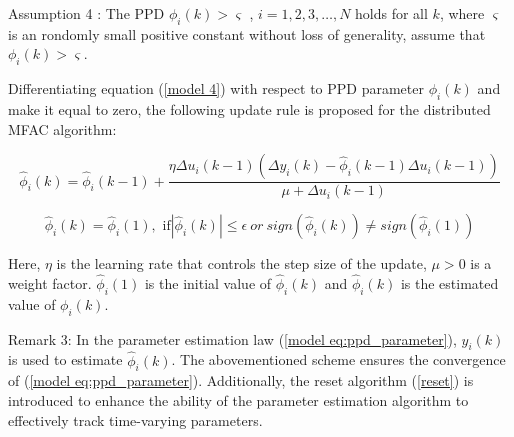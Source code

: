 \documentclass[journal,onecolumn]{IEEEtran}
\begin{document}
Assumption 4 : The PPD \(\phi_i(k) > \varsigma\) , \(i = 1,2,3, \dots, N\) holds for all \(k\), where \( \varsigma \) is an rondomly small positive constant without loss of generality, assume that \(\phi_i(k) > \varsigma\).


Differentiating equation (\ref{model 4}) with respect to PPD parameter \(\phi_i(k)\) and make it equal to zero, the following update rule is proposed for the distributed MFAC algorithm:









\begin{equation}
    \label{model eq:ppd_parameter}
    \hat{\phi}_i(k) = \hat{\phi}_i(k-1) + \frac{\eta \Delta u_i(k-1) (\Delta y_i(k) - \hat{\phi}_i(k-1) \Delta u_i(k-1))}{\mu + \Delta u_i(k-1)}
\end{equation}

\begin{equation}
    \label{reset}
    \hat{\phi}_i(k) = \hat{\phi}_i(1),  \text{    if}  |\hat{\phi}_i(k) | \leq \epsilon \ or \ sign(\hat{\phi}_i(k)) \neq  sign(\hat{\phi}_i(1))
\end{equation}

Here, $\eta$ is the learning rate that controls the step size of the update, $\mu > 0$ is a weight factor. $ \hat{\phi}_i(1) $ is the initial value of $ \hat{\phi}_i(k)$ and $ \hat{\phi}_i(k)$ is the estimated value of $ \phi_i(k)$.

Remark 3: In the parameter estimation law (\ref{model eq:ppd_parameter}), $y_i(k) $ is used to estimate $\hat{\phi}_i(k)$. The abovementioned scheme ensures the convergence of (\ref{model eq:ppd_parameter}). Additionally, the reset algorithm (\ref{reset}) is introduced to enhance the ability of the parameter estimation algorithm to effectively track time-varying parameters.
\end{document}
